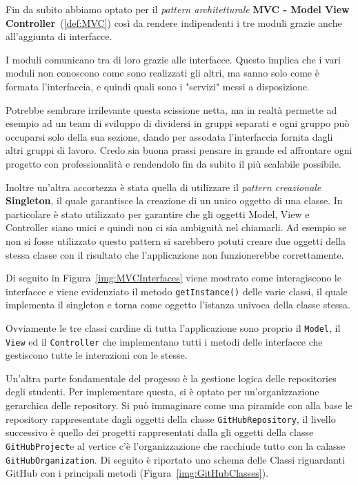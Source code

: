 		Fin da subito abbiamo optato per il \textit{pattern architetturale} \textbf{MVC - Model View Controller}~(\ref{def:MVC}) così da rendere indipendenti i tre moduli grazie anche all'aggiunta di interfacce.
		
		I moduli comunicano tra di loro grazie alle interfacce.
		Questo implica che i vari moduli non conoscono come sono realizzati gli altri, ma sanno solo come è formata l'interfaccia, e quindi quali sono i "servizi" messi a disposizione.
		
		Potrebbe sembrare irrilevante questa scissione netta, ma in realtà permette ad esempio ad un team di sviluppo di dividersi in gruppi separati e ogni gruppo può occuparsi solo della sua sezione, dando per assodata l'interfaccia fornita dagli altri gruppi di lavoro. Credo sia buona prassi pensare in grande ed affrontare ogni progetto con professionalità e rendendolo fin da subito il più scalabile possibile.
		
		Inoltre un'altra accortezza è stata quella di utilizzare il \textit{pattern creazionale} \textbf{Singleton}, il quale garantisce la creazione di un unico oggetto di una classe. In particolare è stato utilizzato per garantire che gli oggetti Model, View e Controller siano unici e quindi non ci sia ambiguità nel chiamarli. Ad esempio se non si fosse utilizzato questo pattern si sarebbero potuti creare due oggetti della stessa classe con il risultato che l'applicazione non funzionerebbe correttamente.
		
		Di seguito in Figura~\ref{img:MVCInterfaces} viene mostrato come interagiscono le interfacce e viene evidenziato il metodo \texttt{getInstance()} delle varie classi, il quale implementa il singleton e torna come oggetto l'istanza univoca della classe stessa.
		
		\begin{center}
			\label{img:MVCInterfaces}
		\end{center}
		
		Ovviamente le tre classi cardine di tutta l'applicazione sono proprio il \verb|Model|, il \verb|View| ed il \verb|Controller| che implementano tutti i metodi delle interfacce che gestiscono tutte le interazioni con le stesse.
		
		Un'altra parte fondamentale del progesso è la gestione logica delle repositories degli studenti.
		Per implementare questa, si è optato per un'organizzazione gerarchica delle repository.
		Si può immaginare come una piramide con alla base le repository rappresentate dagli oggetti della classe \verb|GitHubRepository|, il livello successivo è quello dei progetti rappresentati dalla gli oggetti della classe \verb|GitHubProject|e al vertice c'è l'organizzazione che racchiude tutto con la calasse \verb|GitHubOrganization|.
		Di seguito è riportato uno schema delle Classi riguardanti GitHub con i principali metodi (Figura~\ref{img:GitHubClasses}).
		
